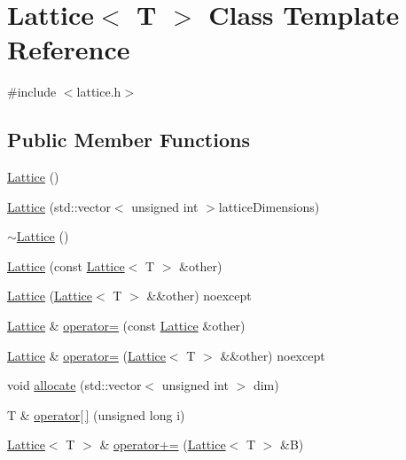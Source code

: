 \hypertarget{class_lattice}{}\section{Lattice$<$ T $>$ Class Template Reference}
\label{class_lattice}


{\ttfamily \#include $<$lattice.\+h$>$}

\subsection*{Public Member Functions}
\begin{DoxyCompactItemize}
\item 
\mbox{\hyperlink{class_lattice_ac32e6300cc5ebc246a060cd67d99f370}{Lattice}} ()
\item 
\mbox{\hyperlink{class_lattice_a0c212e4f17842acee8697ce79eef3dff}{Lattice}} (std\+::vector$<$ unsigned int $>$lattice\+Dimensions)
\item 
\mbox{\hyperlink{class_lattice_a006bd75dd4c599fe17f8ca7e96413487}{$\sim$\+Lattice}} ()
\item 
\mbox{\hyperlink{class_lattice_a74cc98beb36f76dcfa27535e43528d57}{Lattice}} (const \mbox{\hyperlink{class_lattice}{Lattice}}$<$ T $>$ \&other)
\item 
\mbox{\hyperlink{class_lattice_ad2826da8e42dcaea917b9a2e50ca1ca2}{Lattice}} (\mbox{\hyperlink{class_lattice}{Lattice}}$<$ T $>$ \&\&other) noexcept
\item 
\mbox{\hyperlink{class_lattice}{Lattice}} \& \mbox{\hyperlink{class_lattice_acc09c6b9abeafc6b735c3b95d8537edf}{operator=}} (const \mbox{\hyperlink{class_lattice}{Lattice}} \&other)
\item 
\mbox{\hyperlink{class_lattice}{Lattice}} \& \mbox{\hyperlink{class_lattice_a29505c3ad95dc2695401c049cc34ba62}{operator=}} (\mbox{\hyperlink{class_lattice}{Lattice}}$<$ T $>$ \&\&other) noexcept
\item 
void \mbox{\hyperlink{class_lattice_a5b4e162f06f7b4b90b4a9335ed2aabb5}{allocate}} (std\+::vector$<$ unsigned int $>$ dim)
\item 
T \& \mbox{\hyperlink{class_lattice_ab7d585cf03c540d70ff91a58facbdef5}{operator\mbox{[}$\,$\mbox{]}}} (unsigned long i)
\item 
\mbox{\hyperlink{class_lattice}{Lattice}}$<$ T $>$ \& \mbox{\hyperlink{class_lattice_aa5eb9113987a4a411cd57245d591a458}{operator+=}} (\mbox{\hyperlink{class_lattice}{Lattice}}$<$ T $>$ \&B)
\item 

\end{DoxyCompactItemize}
